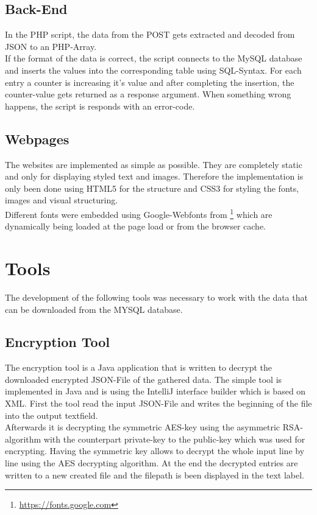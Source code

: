 \subsection{Back-End}
In the PHP script, the data from the POST gets extracted and decoded from JSON to an PHP-Array.\\
If the format of the data is correct, the script connects to the MySQL database and inserts the values into the corresponding table using SQL-Syntax. For each entry a counter is increasing it's value and after completing the insertion, the counter-value gets returned as a response argument. When something wrong happens, the script is responds with an error-code. 

\subsection{Webpages}
The websites are implemented as simple as possible. They are completely static and only for displaying styled text and images. Therefore the implementation is only been done using HTML5 for the structure and CSS3 for styling the fonts, images and visual structuring.\\
Different fonts were embedded using Google-Webfonts from \footnote{\url{https://fonts.google.com}} which are dynamically being loaded at the page load or from the browser cache. 

\section{Tools}
The development of the following tools was necessary to work with the data that can be downloaded from the MYSQL database.

\subsection{Encryption Tool}
The encryption tool is a Java application that is written to decrypt the downloaded encrypted JSON-File of the gathered data.
The simple tool is implemented in Java and is using the IntelliJ interface builder which is based on XML. 
First the tool read the input JSON-File and writes the beginning of the file into the output textfield.\\
Afterwards it is decrypting the symmetric AES-key using the asymmetric RSA-algorithm with the counterpart private-key to the public-key which was used for encrypting. Having the symmetric key allows to decrypt the whole input line by line using the AES decrypting algorithm.
At the end the decrypted entries are written to a new created file and the filepath is been displayed in the text label. 

